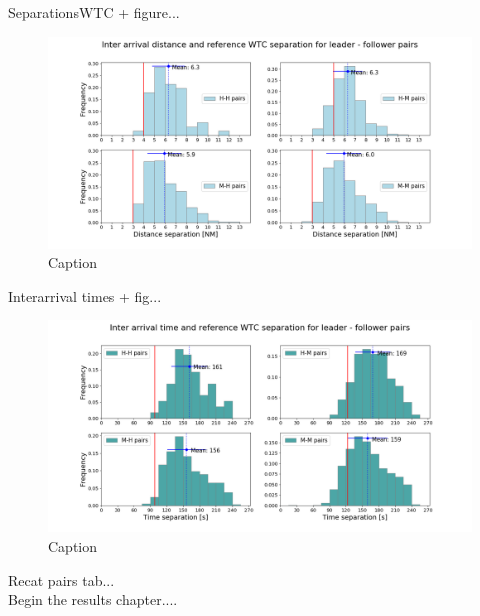 SeparationsWTC + figure...\\

\begin{figure}[h]
    \centering
    \includegraphics[width=1\textwidth]{graphics/fig_dist_separ_HH_HM_MH_MM_pairs.png}
    \caption[list of figures caption]{Caption}
    \label{fig:dist_separ_HH_HM_MH_MM_pairs}
\end{figure}





Interarrival times + fig...\\

\begin{figure}
    \centering
    \includegraphics[width=1\textwidth]{graphics/fig_time_separ_HH_HM_MH_MM_pairs.png}
    \caption[list of figures caption]{Caption}
    \label{fig:time_separ_HH_HM_MH_MM_pairs}
\end{figure}

Recat pairs tab...\\



Begin the results chapter....

